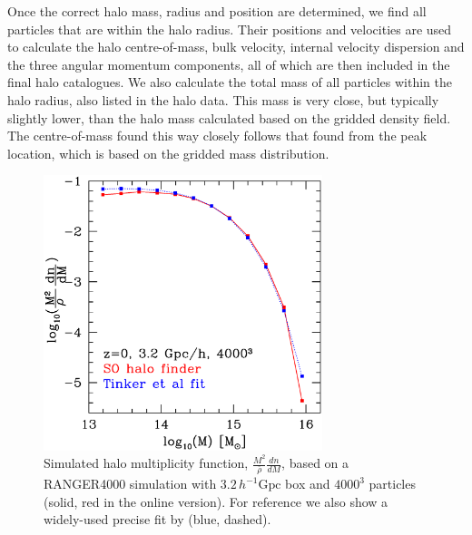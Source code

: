 Once the correct halo mass, radius and position are determined, we find all 
particles that are within the halo radius. Their positions and velocities are
used to calculate the halo centre-of-mass, bulk velocity, internal velocity 
dispersion and the three angular momentum components, all of which are then 
included in the final halo catalogues. We also calculate the total mass of
all particles within the halo radius, also listed in the halo data. This mass
is very close, but  typically slightly lower, than the halo mass calculated 
based on the gridded density field. The  centre-of-mass found this way closely follows 
that found from the peak location, which is based on the gridded mass distribution. 


\begin{figure}%
  \begin{center}
    \includegraphics[width=3.2in]{graphs/mf_z0_Tinker.eps}
  \end{center}
  \caption{Simulated halo multiplicity function, 
    $\frac{M^2}{\bar{\rho}}\frac{dn}{dM}$, based on a
    RANGER4000 simulation with $3.2\,h^{-1} \mbox{Gpc}$ box and $4000^3$ 
    particles (solid, red in the online version). For reference we also show a widely-used 
    precise fit by \citet{2008ApJ...688..709T} (blue, dashed). 
    \label{mf}}
\end{figure}

